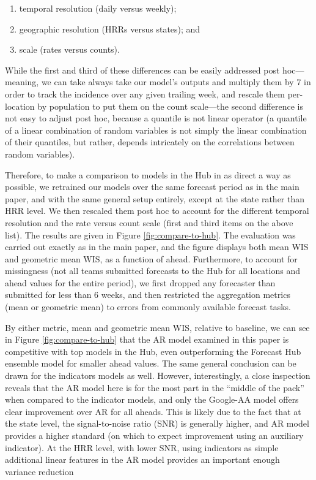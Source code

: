 \begin{enumerate}
\item temporal resolution (daily versus weekly);
\item geographic resolution (HRRs versus states); and 
\item scale (rates versus counts).
\end{enumerate}

While the first and third of these differences can be easily addressed post 
hoc---meaning, we can take always take our model's outputs and multiply them by
7 in order to track the incidence over any given trailing week, and rescale them
per-location by population to put them on the count scale---the second
difference is not easy to adjust post hoc, because a quantile is not linear
operator (a quantile of a linear combination of random variables is not simply
the linear combination of their quantiles, but rather, depends intricately on
the correlations between random variables).

Therefore, to make a comparison to models in the Hub in as direct a way as
possible, we retrained our models over the same forecast period as in the main
paper, and with the same general setup entirely, except at the state rather than 
HRR level.  We then rescaled them post hoc to account for the different temporal
resolution and the rate versus count scale (first and third items on the above
list).  The results are given in Figure \ref{fig:compare-to-hub}.  The
evaluation was carried out exactly as in the main paper, and the figure displays
both mean WIS and geometric mean WIS, as a function of ahead.  Furthermore, to
account for missingness (not all teams submitted forecasts to the Hub for all
locations and ahead values for the entire period), we first dropped any
forecaster than submitted for less than 6 weeks, and then restricted the
aggregation metrics (mean or geometric mean) to errors from commonly available
forecast tasks.   

By either metric, mean and geometric mean WIS, relative to baseline, we can see
in Figure \ref{fig:compare-to-hub} that the AR model examined in this paper is 
competitive with top models in the Hub, even outperforming the Forecast Hub
ensemble model for smaller ahead values.  The same general conclusion can be
drawn for the indicators models as well.  However, interestingly, a close
inspection reveals that the AR model here is for the most part in the ``middle
of the pack'' when compared to the indicator models, and only the Google-AA
model offers clear improvement over AR for all aheads.  This is likely due to
the fact that at the state level, the signal-to-noise ratio (SNR) is generally
higher, and AR model provides a higher standard (on which to expect improvement
using an auxiliary indicator).  At the HRR level, with lower SNR, using
indicators as simple additional linear features in the AR model provides an
important enough variance reduction 

